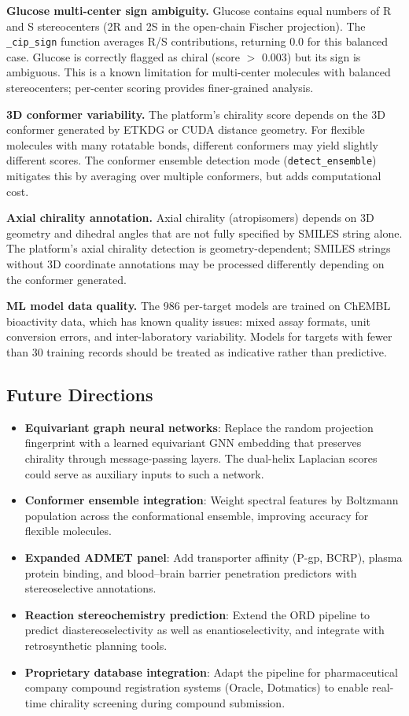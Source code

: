 \documentclass[11pt,a4paper]{article}
\begin{document}
\textbf{Glucose multi-center sign ambiguity.} Glucose contains equal numbers of
R and S stereocenters (2R and 2S in the open-chain Fischer projection). The
\texttt{\_cip\_sign} function averages R/S contributions, returning 0.0 for this
balanced case. Glucose is correctly flagged as chiral (score $>$ 0.003) but its
sign is ambiguous. This is a known limitation for multi-center molecules with
balanced stereocenters; per-center scoring provides finer-grained analysis.

\textbf{3D conformer variability.} The platform's chirality score depends on the
3D conformer generated by ETKDG or CUDA distance geometry. For flexible molecules
with many rotatable bonds, different conformers may yield slightly different
scores. The conformer ensemble detection mode (\texttt{detect\_ensemble})
mitigates this by averaging over multiple conformers, but adds computational
cost.

\textbf{Axial chirality annotation.} Axial chirality (atropisomers) depends on
3D geometry and dihedral angles that are not fully specified by SMILES string
alone. The platform's axial chirality detection is geometry-dependent; SMILES
strings without 3D coordinate annotations may be processed differently depending
on the conformer generated.

\textbf{ML model data quality.} The 986 per-target models are trained on ChEMBL
bioactivity data, which has known quality issues: mixed assay formats, unit
conversion errors, and inter-laboratory variability. Models for targets with
fewer than 30 training records should be treated as indicative rather than
predictive.

\subsection{Future Directions}

\begin{itemize}[leftmargin=1.5em]
  \item \textbf{Equivariant graph neural networks}: Replace the random projection
    fingerprint with a learned equivariant GNN embedding that preserves chirality
    through message-passing layers. The dual-helix Laplacian scores could serve
    as auxiliary inputs to such a network.
  \item \textbf{Conformer ensemble integration}: Weight spectral features by
    Boltzmann population across the conformational ensemble, improving accuracy
    for flexible molecules.
  \item \textbf{Expanded ADMET panel}: Add transporter affinity (P-gp, BCRP),
    plasma protein binding, and blood--brain barrier penetration predictors with
    stereoselective annotations.
  \item \textbf{Reaction stereochemistry prediction}: Extend the ORD pipeline to
    predict diastereoselectivity as well as enantioselectivity, and integrate with
    retrosynthetic planning tools.
  \item \textbf{Proprietary database integration}: Adapt the pipeline for
    pharmaceutical company compound registration systems (Oracle, Dotmatics) to
    enable real-time chirality screening during compound submission.
\end{itemize}
\end{document}
